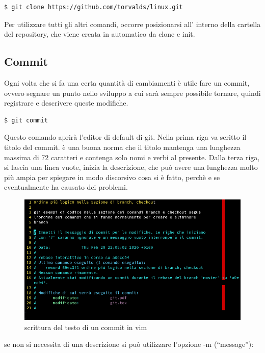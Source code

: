\documentclass{article} \usepackage[textwidth=18cm,textheight=18cm]{geometry}
\begin{document}
\begin{verbatim}
$ git clone https://github.com/torvalds/linux.git
\end{verbatim}

Per utilizzare tutti gli altri comandi, occorre posizionarsi all' interno della
cartella del repository, che viene creata in automatico da clone e init.

\subsection{Commit}

Ogni volta che si fa una certa quantità di cambiamenti è utile fare un commit,
ovvero segnare un punto nello sviluppo a cui sarà sempre possibile tornare,
quindi registrare e descrivere queste modifiche. 

\begin{verbatim}
$ git commit
\end{verbatim}

Questo comando aprirà l'editor di default di git. Nella prima riga va scritto il
titolo del commit. è una buona norma che il titolo mantenga una lunghezza
massima di 72 caratteri e contenga solo nomi e verbi al presente. Dalla
terza riga, si lascia una linea vuote, inizia la descrizione, che può avere una 
lunghezza molto più ampia per spiegare in modo discorsivo cosa si è fatto, 
perchè e se eventualmente ha causato dei problemi.

\begin{figure}
\includegraphics[width=6in]{vimEditCommit.png}
\centering
\caption{scrittura del testo di un commit in vim}
\end{figure}

se non si necessita di una descrizione si può utilizzare l'opzione -m
(``message''):
\end{document}
